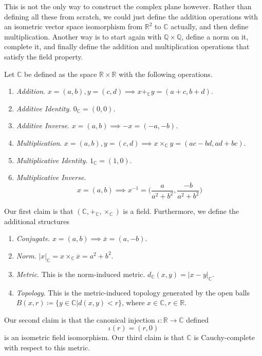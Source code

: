 \documentclass{article}
\begin{document}
    This is not the only way to construct the complex plane however. Rather than defining all these from scratch, we could just define the addition operations with an isometric vector space isomorphism from $\mathbb{R}^2$ to $\mathbb{C}$ actually, and then define multiplication. Another way is to start again with $\mathbb{Q} \times \mathbb{Q}$, define a norm on it, complete it, and finally define the addition and multiplication operations that satisfy the field property.   

    \begin{theorem}
      Let $\mathbb{C}$ be defined as the space $\mathbb{R} \times \mathbb{R}$ with the following operations. 
      \begin{enumerate}
        \item \textit{Addition}. $x = (a, b), y = (c, d) \implies x +_{\mathbb{C}} y = (a + c, b + d)$. 
        \item \textit{Additive Identity}. $0_{\mathbb{C}} = (0, 0)$. 
        \item \textit{Additive Inverse}. $x = (a, b) \implies -x = (-a, -b)$. 
        \item \textit{Multiplication}. $x = (a, b), y = (c, d) \implies x \times_{\mathbb{C}} y = (ac - bd, ad + bc)$. 
        \item \textit{Multiplicative Identity}. $1_{\mathbb{C}} = (1, 0)$. 
        \item \textit{Multiplicative Inverse}. 
        \begin{equation}
          x = (a, b) \implies x^{-1} = \bigg( \frac{a}{a^2 + b^2}, \frac{-b}{a^2 + b^2} \bigg)
        \end{equation}
      \end{enumerate}
      Our first claim is that $(\mathbb{C}, +_{\mathbb{C}}, \times_{\mathbb{C}})$ is a field. Furthermore, we define the additional structures
      \begin{enumerate}
        \item \textit{Conjugate}. $x = (a, b) \implies \overline{x} = (a, -b)$. 
        \item \textit{Norm}. $|x|_{\mathbb{C}} = x \times_{\mathbb{C}} \overline{x} = a^2 + b^2$. 
        \item \textit{Metric}. This is the norm-induced metric. $d_{\mathbb{C}}(x, y) = |x - y|_{\mathbb{C}}$. 
        \item \textit{Topology}. This is the metric-induced topology generated by the open balls $B(x, r) \coloneqq \{y \in \mathbb{C} | d(x, y) < r\}$, where $x \in \mathbb{C}, r \in \mathbb{R}$. 
      \end{enumerate} 
      Our second claim is that the canonical injection $\iota: \mathbb{R} \rightarrow \mathbb{C}$ defined 
      \begin{equation}
        \iota(r) = (r, 0)
      \end{equation}
      is an isometric field isomorphism. Our third claim is that $\mathbb{C}$ is Cauchy-complete with respect to this metric. 
    \end{theorem} 
\end{document}

